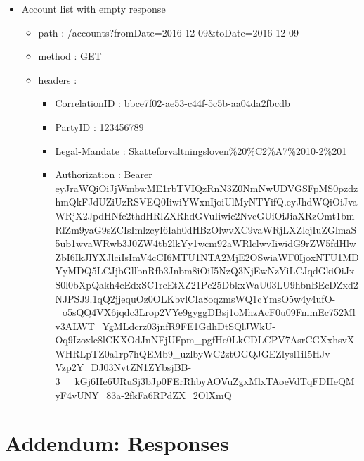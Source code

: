 \documentclass[12pt]{report}
\begin{document}
\begin{itemize}
  \item Account list with empty response
  \begin{itemize}
    \item path : /accounts?fromDate=2016-12-09&toDate=2016-12-09
    \item method : GET
    \item headers :
    \begin{itemize}
      \item CorrelationID : bbce7f02-ae53-c44f-5c5b-aa04da2fbcdb
      \item PartyID : 123456789
      \item Legal-Mandate : Skatteforvaltningsloven\%20\%C2\%A7\%2010-2\%201
      \item Authorization : Bearer eyJraWQiOiJjWmbwME1rbTVIQzRnN3Z0NmNwUDVGSFpMS0pzdzhmQkFJdUZiUzRSVEQ0IiwiYWxnIjoiUlMyNTYifQ.eyJhdWQiOiJvaWRjX2JpdHNfc2thdHRlZXRhdGVuIiwic2NvcGUiOiJiaXRzOmt1bmRlZm9yaG9sZCIsImlzcyI6Iah0dHBzOlwvXC9vaWRjLXZlcjIuZGlmaS5ub1wvaWRwb3J0ZW4tb2lkYy1wcm92aWRlclwvIiwidG9rZW5fdHlwZbI6IkJlYXJlciIsImV4cCI6MTU1NTA2MjE2OSwiaWF0IjoxNTU1MDYyMDQ5LCJjbGllbnRfb3Jnbm8iOiI5NzQ3NjEwNzYiLCJqdGkiOiJxS0l0bXpQakh4cEdxSC1rcEtXZ21Pc25DbkxWaU03LU9hbnBEcDZxd2NJPSJ9.1qQ2jjequOz0OLKbvlCIa8oqzmsWQ1cYmsO5w4y4ufO-\_o5sQQ4VX6jqdc3Lrop2VYe9gyggDBsj1oMhzAcF0u09FmmEc752Mlv3ALWT\_YgMLdcrz03jnfR9FE1GdhDtSQlJWkU-Oq9Izoxlc8lCKXOdJnNFjUFpm\_pgfHe0LkCDLCPV7AsrCGXxhsvXWHRLpTZ0a1rp7hQEMb9\_uzlbyWC2ztOGQJGEZlysl1iI5HJv-Vzp2Y\_DJ03NvtZN1ZYbsjBB-3\_\_kGj6He6URuSj3bJp0FErRhbyAOVuZgxMlxTAoeVdTqFDHeQMyF4vUNY\_83a-2fkFa6RPdZX\_2OlXmQ
    \end{itemize}
  \end{itemize}
\end{itemize}

\appendix
\chapter*{Addendum: Responses}
\renewcommand{\thesection}{A\arabic{section}}
\end{document}
